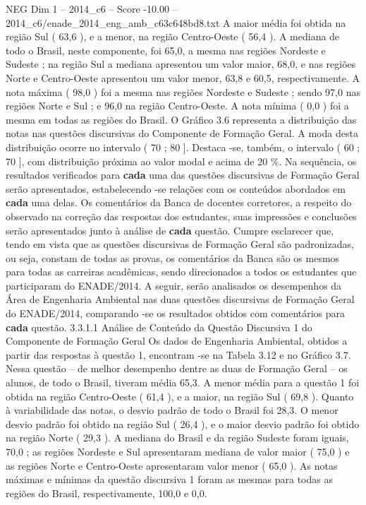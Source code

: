 \begin{textsample}{NEG Dim 1 – 2014\_c6 – Score -10.00 – 2014\_c6/enade\_2014\_eng\_amb\_c63c648bd8.txt}
A maior média foi obtida na região Sul ( 63,6 ), e a menor, na região Centro-Oeste ( 56,4 ).
A mediana de todo o Brasil, neste componente, foi 65,0, a mesma nas regiões Nordeste e Sudeste ; na região Sul a mediana apresentou um valor maior, 68,0, e nas regiões Norte e Centro-Oeste apresentou um valor menor, 63,8 e 60,5, respectivamente.
A nota máxima ( 98,0 ) foi a mesma nas regiões Nordeste e Sudeste ; sendo 97,0 nas regiões Norte e Sul ; e 96,0 na região Centro-Oeste.
A nota mínima ( 0,0 ) foi a mesma em todas as regiões do Brasil.
O Gráfico 3.6 representa a distribuição das notas nas questões discursivas do Componente de Formação Geral.
A moda desta distribuição ocorre no intervalo ( 70 ; 80 ].
Destaca -se, também, o intervalo ( 60 ; 70 ], com distribuição próxima ao valor modal e acima de 20 \%.
Na sequência, os resultados verificados para \textbf{cada} uma das questões discursivas de Formação Geral serão apresentados, estabelecendo -se relações com os conteúdos abordados em \textbf{cada} uma delas.
Os comentários da Banca de docentes corretores, a respeito do observado na correção das respostas dos estudantes, suas impressões e conclusões serão apresentados junto à análise de \textbf{cada} questão.
Cumpre esclarecer que, tendo em vista que as questões discursivas de Formação Geral são padronizadas, ou seja, constam de todas as provas, os comentários da Banca são os mesmos para todas as carreiras acadêmicas, sendo direcionados a todos os estudantes que participaram do ENADE/2014.
A seguir, serão analisados os desempenhos da Área de Engenharia Ambiental nas duas questões discursivas de Formação Geral do ENADE/2014, comparando -se os resultados obtidos com comentários para \textbf{cada} questão. 3.3.1.1 Análise de Conteúdo da Questão Discursiva 1 do Componente de Formação Geral Os dados de Engenharia Ambiental, obtidos a partir das respostas à questão 1, encontram -se na Tabela 3.12 e no Gráfico 3.7.
Nessa questão – de melhor desempenho dentre as duas de Formação Geral – os alunos, de todo o Brasil, tiveram média 65,3.
A menor média para a questão 1 foi obtida na região Centro-Oeste ( 61,4 ), e a maior, na região Sul ( 69,8 ).
Quanto à variabilidade das notas, o desvio padrão de todo o Brasil foi 28,3.
O menor desvio padrão foi obtido na região Sul ( 26,4 ), e o maior desvio padrão foi obtido na região Norte ( 29,3 ).
A mediana do Brasil e da região Sudeste foram iguais, 70,0 ; as regiões Nordeste e Sul apresentaram mediana de valor maior ( 75,0 ) e as regiões Norte e Centro-Oeste apresentaram valor menor ( 65,0 ).
As notas máximas e mínimas da questão discursiva 1 foram as mesmas para todas as regiões do Brasil, respectivamente, 100,0 e 0,0.

\end{textsample}
